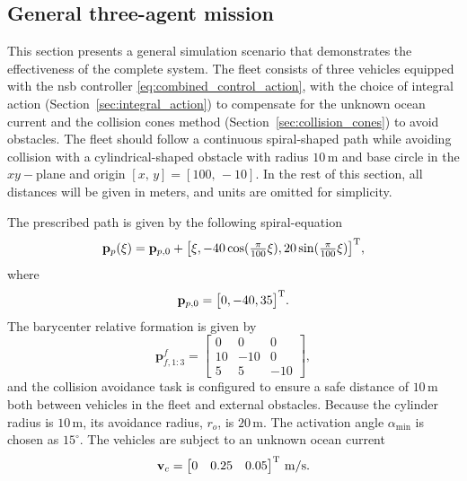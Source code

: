 \subsection{General three-agent mission}\label{sec:general_three_agent}
This section presents a general simulation scenario that demonstrates the effectiveness of the complete system. The fleet consists of three vehicles equipped with the \gls{nsb} controller \eqref{eq:combined_control_action}, with the choice of integral action (Section~\ref{sec:integral_action}) to compensate for the unknown ocean current and the collision cones method (Section~\ref{sec:collision_cones}) to avoid obstacles. The fleet should follow a continuous spiral-shaped path while avoiding collision with a cylindrical-shaped obstacle with radius $10\, \mathrm{m}$ and base circle in the $xy-$plane and origin $[x, \, y] = [100,\, -10]$. In the rest of this section, all distances will be given in meters, and units are omitted for simplicity.

The prescribed path is given by the following spiral-equation
\begin{equation}
       \mathbf{p}_p(\xi) = \mathbf{p}_{p,0} + \bigl[\xi, -40 \cos(\tfrac{\pi}{100} \xi), 20 \sin(\tfrac{\pi}{100} \xi)\bigr]^{\rm T},
\end{equation}
where \begin{equation}
    \mathbf{p}_{p,0} = \bigl[ 0, -40, 35 \bigr]^{\rm T}.
\end{equation}
The barycenter relative formation is given by
\begin{equation}\label{eq:desired_formation_sim}
    \mathbf{p}_{f,1:3}^f = \begin{bmatrix}0 & 0 & 0 \\ 10 & -10 & 0 \\ 5 & 5 & -10\end{bmatrix},%
\end{equation}
and the collision avoidance task is configured to ensure a safe distance of $10\, \mathrm{m}$ both between vehicles in the fleet and external obstacles. Because the cylinder radius is $10\, \mathrm{m}$, its avoidance radius, $r_o$, is $20\, \mathrm{m}$. The activation angle $\alpha_{\min}$ is chosen as $15^\circ$. The vehicles are subject to an unknown ocean current 
\begin{equation}
    \mathbf{v}_c = \begin{bmatrix}
        0 & 0.25 & 0.05
    \end{bmatrix}^{\rm T} \,\mathrm{m/s}.
\end{equation}


